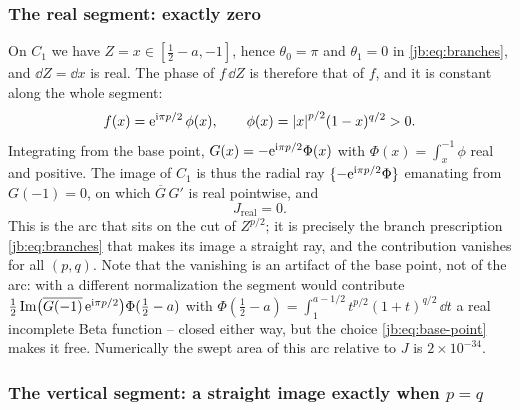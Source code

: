 \subsubsection{The real segment: exactly zero}
\label{jb:sec:arcs:real}

On $C_1$ we have $Z = x \in [\tfrac12 - a, -1]$, hence $\theta_0 = \pi$ and $\theta_1 = 0$ in
\eqref{jb:eq:branches}, and $\dd Z = \dd x$ is real.
The phase of $f \, \dd Z$ is therefore that of $f$, and it is constant along the whole segment:
\begin{equation}
  \label{jb:eq:f-real}
  f(x)
    = \mathrm{e}^{\mathrm{i} \pi p / 2} \, \phi(x),
  \qquad
  \phi(x)
    = {|x|}^{p/2} (1 - x)^{q/2}
    > 0 .
\end{equation}
Integrating from the base point, $G(x) = - \mathrm{e}^{\mathrm{i} \pi p/2} \Phi(x)$ with
$\Phi(x) = \int_x^{-1} \phi$ real and positive.
The image of $C_1$ is thus the radial ray $\{ - \mathrm{e}^{\mathrm{i} \pi p/2} \Phi \}$ emanating from
$G(-1) = 0$, on which $\overline{G} \, G'$ is real pointwise, and
\begin{equation}
  \label{jb:eq:J-real}
  J_{\text{real}}
    = 0 .
\end{equation}
This is the arc that sits on the cut of $Z^{p/2}$; it is precisely the branch prescription
\eqref{jb:eq:branches} that makes its image a straight ray, and the contribution vanishes for all
$(p, q)$.
Note that the vanishing is an artifact of the base point, not of the arc: with a different
normalization the segment would contribute
$\tfrac12 \operatorname{Im} \bigl( \overline{G(-1)} \, \mathrm{e}^{\mathrm{i} \pi p/2} \bigr) \Phi(\tfrac12 - a)$ with
$\Phi(\tfrac12 - a) = \int_1^{a - 1/2} t^{p/2} (1 + t)^{q/2} \, \dd t$ a real incomplete Beta
function -- closed either way, but the choice \eqref{jb:eq:base-point} makes it free.
Numerically the swept area of this arc relative to $J$ is $2 \times 10^{-34}$.


\subsubsection{The vertical segment: a straight image exactly when $p = q$}
\label{jb:sec:arcs:vertical}

